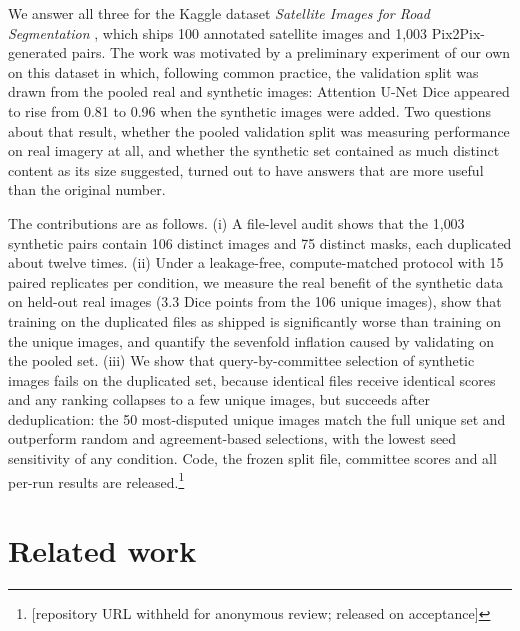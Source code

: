 \documentclass[11pt]{article}
\newcommand{\repourl}{[repository URL withheld for anonymous review; released on acceptance]}
\newcommand{\repourl}{\url{https://github.com/hz6yc3/attention-enhanced-unet-segmentation}}
\begin{document}
We answer all three for the Kaggle dataset \emph{Satellite Images for Road Segmentation} \citep{sanadalali}, which ships 100 annotated satellite images and 1{,}003 Pix2Pix-generated pairs. The work was motivated by a preliminary experiment of our own on this dataset in which, following common practice, the validation split was drawn from the pooled real and synthetic images: Attention U-Net Dice appeared to rise from 0.81 to 0.96 when the synthetic images were added. Two questions about that result, whether the pooled validation split was measuring performance on real imagery at all, and whether the synthetic set contained as much distinct content as its size suggested, turned out to have answers that are more useful than the original number.

The contributions are as follows. (i) A file-level audit shows that the 1{,}003 synthetic pairs contain 106 distinct images and 75 distinct masks, each duplicated about twelve times. (ii) Under a leakage-free, compute-matched protocol with 15 paired replicates per condition, we measure the real benefit of the synthetic data on held-out real images (3.3 Dice points from the 106 unique images), show that training on the duplicated files as shipped is significantly worse than training on the unique images, and quantify the sevenfold inflation caused by validating on the pooled set. (iii) We show that query-by-committee selection of synthetic images fails on the duplicated set, because identical files receive identical scores and any ranking collapses to a few unique images, but succeeds after deduplication: the 50 most-disputed unique images match the full unique set and outperform random and agreement-based selections, with the lowest seed sensitivity of any condition. Code, the frozen split file, committee scores and all per-run results are released.\footnote{\repourl}

\section{Related work}
\end{document}
